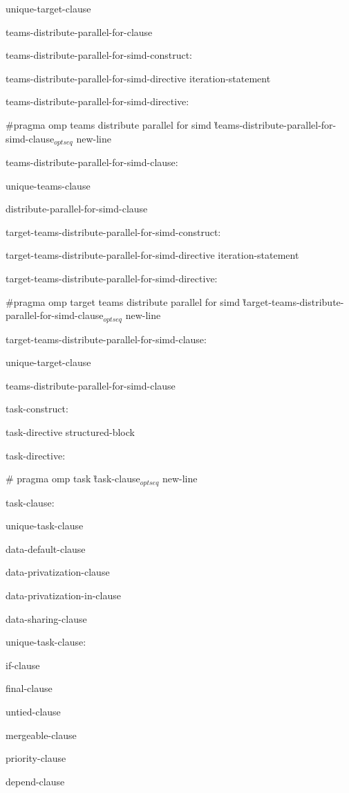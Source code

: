 {\I unique-target-clause

\I teams-distribute-parallel-for-clause

teams-distribute-parallel-for-simd-construct:

\I teams-distribute-parallel-for-simd-directive iteration-statement

teams-distribute-parallel-for-simd-directive:

\C\I \#pragma omp teams distribute parallel for simd \G teams-distribute-parallel-for-simd-clause$_{optseq}$ new-line

teams-distribute-parallel-for-simd-clause:

\I unique-teams-clause

\I distribute-parallel-for-simd-clause

target-teams-distribute-parallel-for-simd-construct:

\I target-teams-distribute-parallel-for-simd-directive iteration-statement

target-teams-distribute-parallel-for-simd-directive:

\C\I \#pragma omp target teams distribute parallel for simd \G target-teams-distribute-parallel-for-simd-clause$_{optseq}$ new-line

target-teams-distribute-parallel-for-simd-clause:

\I unique-target-clause

\I teams-distribute-parallel-for-simd-clause

task-construct:

\I task-directive structured-block

task-directive:

\C\I \# pragma omp task \G task-clause$_{optseq}$ new-line

task-clause:

\I unique-task-clause

\I data-default-clause

\I data-privatization-clause

\I data-privatization-in-clause

\I data-sharing-clause

unique-task-clause:

\I if-clause

\I final-clause

\I untied-clause

\I mergeable-clause 

\I priority-clause

\I depend-clause

}
